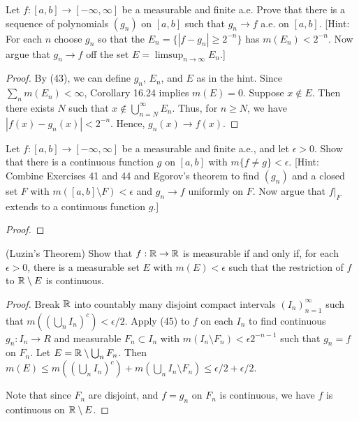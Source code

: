 \documentclass{article}
\begin{document}
 Let $f: [a,b] \to [-\infty,\infty]$ be a measurable and finite a.e. Prove that there is a sequence of polynomials $(g_n)$ on $[a,b]$ such that $g_n \to f$ a.e. on $[a,b]$. [Hint: For each $n$ choose $g_n$ so that the $E_n = \{|f-g_n| \ge 2^{-n}\}$ has $m(E_n) < 2^{-n}$. Now argue that $g_n \to f$ off the set $E = \limsup_{n\to\infty} E_n$.]
\begin{proof}
By (43), we can define $g_n$, $E_n$, and $E$ as in the hint. Since $\sum_n m(E_n) < \infty$, Corollary 16.24 implies $m(E) = 0$.  Suppose $x \not\in E$. Then there exists $N$ such that $x \not\in \bigcup_{n=N}^\infty E_n$. Thus, for $n \ge N$, we have $|f(x) - g_n(x)| < 2^{-n}$. Hence, $g_n(x) \to f(x)$.
\end{proof}
 Let $f: [a,b] \to [-\infty,\infty]$ be a measurable and finite a.e., and let $\epsilon >0$. Show that there is a continuous function $g$ on $[a,b]$ with $m\{f \ne g\} < \epsilon$. [Hint: Combine Exercises 41 and 44 and Egorov's theorem to find $(g_n)$ and a closed set $F$ with $m([a,b]\setminus F) < \epsilon$ and $g_n \to f$ uniformly on $F$. Now argue that $f|_F$ extends to a continuous function $g$.]
\begin{proof}
\begin{comment}
Let $\epsilon >0$.  Pick polynomials $g_n$ and a sets $E, E_k$ as in (44). Pick $N$ so large that $G := \bigcap_{n \le N} \bigcup_{k \ge n} E_k$ has $m(G) < \epsilon$. By the regularity of $m$, there exists a closed set $F$ such that $([a,b]\setminus F) \supset G$ and $m([a,b]\setminus F) < \epsilon$.

 Pick $N$ such that $2^{-N} <\epsilon/2$.  . Then, if $T := \bigcup_{n=N+1}^\infty E_n$, we have $m(T) < 2^{-N}$ and, for all $n>N$, we have $|g_n - f| < 2^{-N}$ on $T^c$. By the inner regularity of $m$, pick a closed set $F \subset T^c$ such that $m(T^c\setminus F) < \epsilon/2$. Then for all $n>N$, we have $|g_n - f| < 2^{-N}$ on $F$.

\end{comment}

\end{proof}
 (Luzin's Theorem) Show that $f: \mathbb{R}\to\mathbb{R}$ is measurable if and only if, for each $\epsilon >0$, there is a measurable set $E$ with $m(E) < \epsilon$ such that the restriction of $f$ to $\mathbb{R}\setminus E$ is continuous.
\begin{proof}
Break $\mathbb{R}$ into countably many disjoint compact intervals $(I_n)_{n=1}^\infty$ such that $m((\bigcup_n I_n)^c) < \epsilon/2$.  Apply (45) to $f$ on each $I_n$ to find continuous $g_n: I_n \to R$ and measurable $F_n \subset I_n$ with $m(I_n \setminus F_n) < \epsilon 2^{-n-1}$ such that $g_n = f$ on $F_n$. Let $E = \mathbb{R} \setminus \bigcup_n F_n$. Then $m(E) \le m((\bigcup_n I_n)^c) + m(\bigcup_n I_n \setminus F_n) \le \epsilon/2 + \epsilon/2$.

Note that since $F_n$ are disjoint, and $f = g_n$ on $F_n$ is continuous, we have $f$ is continuous on $\mathbb{R} \setminus E$.
\end{proof}
\end{document}
